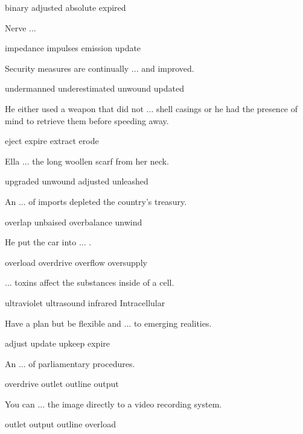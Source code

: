 \documentclass{exam}
\begin{document}
\begin{questions}
\begin{oneparchoices}
\choice binary
\choice adjusted
\correctchoice absolute
\choice expired 
\end{oneparchoices}
\question Nerve ...\\
\begin{oneparchoices}
\choice impedance 
\correctchoice impulses
\choice emission 
\choice update
\end{oneparchoices}
\question Security measures are continually ... and improved.\\
\begin{oneparchoices}
\choice undermanned
\choice underestimated
\choice unwound
\correctchoice updated
\end{oneparchoices}
\question He either used a weapon that did not ... shell casings or he had the presence of mind to retrieve them before speeding away.\\
\begin{oneparchoices}
\correctchoice eject
\choice expire
\choice extract
\choice erode
\end{oneparchoices}
\question Ella ... the long woollen scarf from her neck.\\
\begin{oneparchoices}
\choice upgraded
\correctchoice unwound
\choice adjusted
\choice unleashed
\end{oneparchoices}
\question An ... of imports depleted the country's treasury.\\
\begin{oneparchoices}
\choice overlap
\choice unbaised
\correctchoice overbalance
\choice unwind
\end{oneparchoices}
\question He put the car into ... .\\
\begin{oneparchoices}
\choice overload
\correctchoice overdrive
\choice overflow
\choice oversupply
\end{oneparchoices}
\question ... toxins affect the substances inside of a cell.\\
\begin{oneparchoices}
\choice ultraviolet
\choice ultrasound
\choice infrared
\correctchoice Intracellular
\end{oneparchoices}
\question Have a plan but be flexible and ... to emerging realities.\\
\begin{oneparchoices}
\correctchoice adjust
\choice update
\choice upkeep
\choice expire
\end{oneparchoices}
\question An ... of parliamentary procedures.\\
\begin{oneparchoices}
\choice overdrive
\choice outlet
\correctchoice outline
\choice output
\end{oneparchoices}
\question You can ... the image directly to a video recording system.\\
\begin{oneparchoices}
\choice outlet
\correctchoice output
\choice outline
\choice overload
\end{oneparchoices}
\end{questions}
\end{document}
